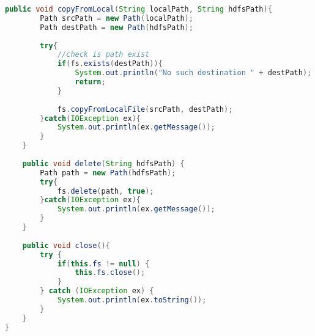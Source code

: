 \begin{lstlisting}[language=Java,basicstyle=\tiny,caption=HDFSOperation.java]
    public void copyFromLocal(String localPath, String hdfsPath){
        Path srcPath = new Path(localPath);
        Path destPath = new Path(hdfsPath);
        
        try{
            //check is path exist
            if(fs.exists(destPath)){
                System.out.println("No such destination " + destPath);
                return;
            }
            
            fs.copyFromLocalFile(srcPath, destPath);
        }catch(IOException ex){
            System.out.println(ex.getMessage());
        }
    }
    
    public void delete(String hdfsPath) {
        Path path = new Path(hdfsPath);
        try{
            fs.delete(path, true);
        }catch(IOException ex){
            System.out.println(ex.getMessage());
        }
    }
    
    public void close(){
        try {
            if(this.fs != null) {
                this.fs.close();
            }
        } catch (IOException ex) {
            System.out.println(ex.toString());
        }
    }
}
\end{lstlisting}

